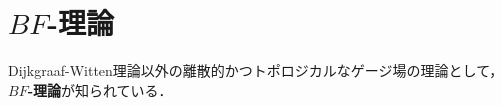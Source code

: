 \documentclass[TQFT_main]{subfiles}
\begin{document}
\section{$BF$-理論}

Dijkgraaf-Witten理論以外の離散的かつトポロジカルなゲージ場の理論として，\textbf{$BF$-理論}が知られている．



\end{document}
